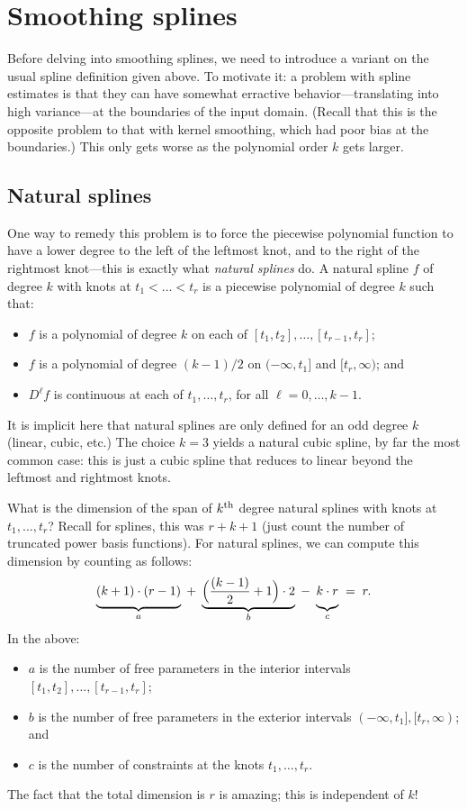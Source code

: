 \documentclass{article}
\begin{document}
\section{Smoothing splines}

Before delving into smoothing splines, we need to introduce a variant on the
usual spline definition given above. To motivate it: a problem with spline
estimates is that they can have somewhat erractive behavior---translating into
high variance---at the boundaries of the input domain. (Recall that this is the
opposite problem to that with kernel smoothing, which had poor bias at the
boundaries.) This only gets worse as the polynomial order $k$ gets larger.   

\subsection{Natural splines}

One way to remedy this problem is to force the piecewise polynomial function to
have a lower degree to the left of the leftmost knot, and to the right of the
rightmost knot---this is exactly what \emph{natural splines} do. A natural
spline $f$ of degree $k$ with knots at $t_1 < \dots < t_r$ is a piecewise
polynomial of degree $k$ such that:
\begin{itemize}
\item $f$ is a polynomial of degree $k$ on each of $[t_1,t_2], \dots,
  [t_{r-1},t_r]$; 
\item $f$ is a polynomial of degree $(k-1)/2$ on $(-\infty,t_1]$ and
  $[t_r,\infty)$; and 
\item $D^\ell f$ is continuous at each of $t_1,\dots,t_r$, for all
  $\ell=0,\dots,k-1$. 
\end{itemize}
It is implicit here that natural splines are only defined for an odd degree $k$
(linear, cubic, etc.) The choice $k=3$ yields a natural cubic spline, by far the
most common case: this is just a cubic spline that reduces to linear beyond the 
leftmost and rightmost knots.     

What is the dimension of the span of $k^{\text{th}}$ degree natural splines with knots at
$t_1,\dots,t_r$? Recall for splines, this was $r+k+1$ (just count the number of
truncated power basis functions). For natural splines, we can compute this
dimension by counting as follows:  
\[
\underbrace{\vphantom{\Big(\Big)} (k+1)\cdot(r-1)}_{a} \;+\; 
\underbrace{\Big(\frac{(k-1)}{2}+1\Big) \cdot 2}_{b} \;-\;
\underbrace{\vphantom{\Big(\Big)} k \cdot r}_{c} \;=\; r. 
\]
In the above: 
\begin{itemize}
\item $a$ is the number of free parameters in the interior intervals $[t_1,t_2], 
  \dots, [t_{r-1},t_r]$;
\item $b$ is the number of free parameters in the exterior intervals $(-\infty,t_1],
  [t_r,\infty)$; and 
\item $c$ is the number of constraints at the knots $t_1,\dots,t_r$.  
\end{itemize}
The fact that the total dimension is $r$ is amazing; this is independent of $k$!  
\end{document}

